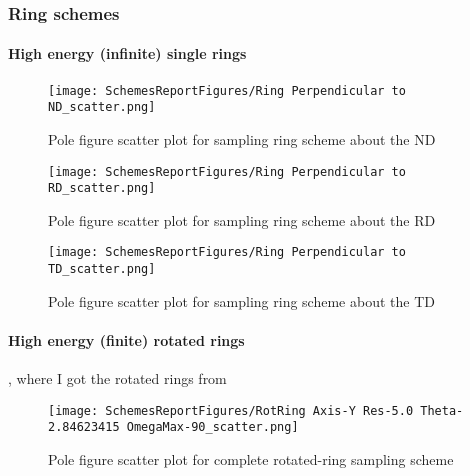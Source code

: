 \documentclass{article}
\begin{document}
\subsubsection{Ring schemes}

\paragraph{High energy (infinite) single rings}

\begin{figure}[H]
    \centering
    \texttt{[image: SchemesReportFigures/Ring Perpendicular to ND\_scatter.png]}
    \caption{Pole figure scatter plot for sampling ring scheme about the ND}
\end{figure}

\begin{figure}[H]
    \centering
    \texttt{[image: SchemesReportFigures/Ring Perpendicular to RD\_scatter.png]}
    \caption{Pole figure scatter plot for sampling ring scheme about the RD}
\end{figure}

\begin{figure}[H]
    \centering
    \texttt{[image: SchemesReportFigures/Ring Perpendicular to TD\_scatter.png]}
    \caption{Pole figure scatter plot for sampling ring scheme about the TD}
\end{figure}




\paragraph{High energy (finite) rotated rings}



\cite{phan_micromechanical_2019}, where I got the rotated rings from

\begin{figure}[H]
    \centering
    \texttt{[image: SchemesReportFigures/RotRing Axis-Y Res-5.0 Theta-2.84623415 OmegaMax-90\_scatter.png]}
    \caption{Pole figure scatter plot for complete rotated-ring sampling scheme}
\end{figure}
\end{document}
